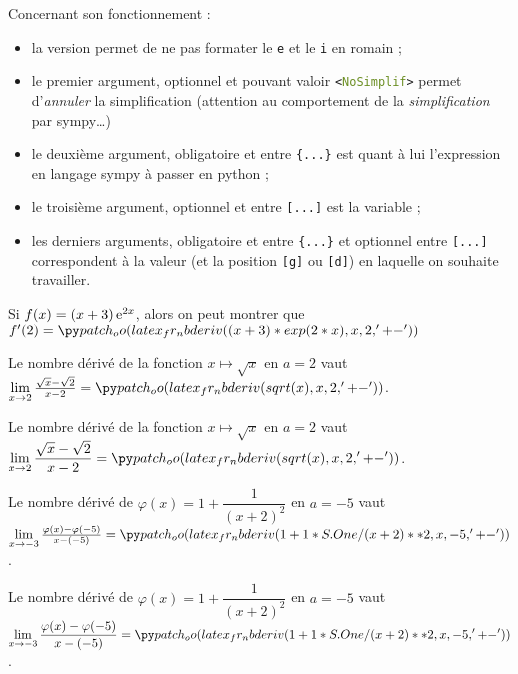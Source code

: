 \documentclass[french,a4paper,11pt]{article}
\newcommand\Cle[1]{{\bfseries\sffamily\textlangle #1\textrangle}}
\begin{document}
\begin{tipblock}
Concernant son fonctionnement :

\begin{itemize}
	\item la version \Cle{*} permet de ne pas formater le \texttt{e} et le \texttt{i} en \textsf{romain} ;
	\item le premier argument, optionnel et pouvant valoir \texttt{<\textcolor{OliveDrab}{NoSimplif}>} permet d'\textit{annuler} la simplification (attention au comportement de la \textit{simplification} par \textsf{sympy}\ldots)
	\item le deuxième argument, obligatoire et entre \texttt{\{...\}} est quant à lui l'expression en langage \textsf{sympy} à passer en \textsf{python} ;
	\item le troisième argument, optionnel et entre \texttt{[...]} est la variable ;
	\item les derniers arguments, obligatoire et entre \texttt{\{...\}} et optionnel entre \texttt{[...]} correspondent à la valeur (et la position \texttt{[g]} ou \texttt{[d]}) en laquelle on souhaite travailler.
\end{itemize}
\vspace*{-\baselineskip}\leavevmode
\end{tipblock}

\begin{bloctext}
Si $f(x)=(x+3)\,\mathrm{e}^{2x}$, alors on peut montrer que $f'(2) = \sympynbderiv{(x+3)*exp(2*x)}{2}$
\end{bloctext}

\begin{bloctext}
Le nombre dérivé de la fonction $x \mapsto \sqrt{x}$ en $a=2$ vaut 
$\lim\limits_{x \to 2} \frac{\sqrt{x}-\sqrt{2}}{x-2} = \sympynbderiv{sqrt(x)}{2}$.

Le nombre dérivé de la fonction $x \mapsto \sqrt{x}$ en $a=2$ vaut 
$\lim\limits_{x \to 2} \dfrac{\sqrt{x}-\sqrt{2}}{x-2} = \dsympynbderiv{sqrt(x)}{2}$.
\end{bloctext}

\begin{bloctext}
Le nombre dérivé de $\varphi(x) = 1+\dfrac{1}{(x+2)^2}$ en $a=-5$ vaut 
$\lim\limits_{x \to -3} \frac{\varphi(x)-\varphi(-5)}{x-(-5)} = \sympynbderiv{1+1/(x+2)**2}{-5}$.

Le nombre dérivé de $\varphi(x) = 1+\dfrac{1}{(x+2)^2}$ en $a=-5$ vaut 
$\lim\limits_{x \to -3} \dfrac{\varphi(x)-\varphi(-5)}{x-(-5)} = \dsympynbderiv{1+1/(x+2)**2}{-5}$.
\end{bloctext}
\end{document}
